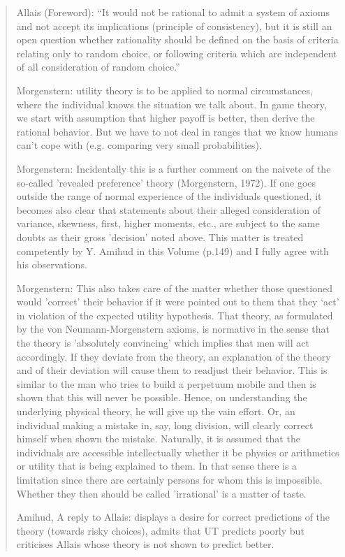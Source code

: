 \documentclass[preprint, french, english, 11pt, authoryear]{elsarticle}%
\begin{document}
\begin{quote}
Allais (Foreword): “It would not be rational to admit a system of axioms and not accept its implications (principle of consistency), but it is still an open question whether rationality should be defined on the basis of criteria relating only to random choice, or following criteria which are independent of all consideration of random choice.” 

Morgenstern: utility theory is to be applied to normal circumstances, where the individual knows the situation we talk about. In game theory, we start with assumption that higher payoff is better, then derive the rational behavior. But we have to not deal in ranges that we know humans can’t cope with (e.g. comparing very small probabilities).

Morgenstern: Incidentally this is a further comment on the naivete of the so-called 'revealed preference' theory (Morgenstern, 1972). If one goes outside the range of normal experience of the individuals questioned, it becomes also clear that statements about their alleged consideration of variance, skewness, first, higher moments, etc., are subject to the same doubts as their gross 'decision' noted above. This matter is treated competently by Y. Amihud in this Volume (p.149) and I fully agree with his observations.

Morgenstern: This also takes care of the matter whether those questioned would 'correct' their behavior if it were pointed out to them that they ‘act’ in violation of the expected utility hypothesis. That theory, as formulated by the von Neumann-Morgenstern axioms, is normative in the sense that the theory is 'absolutely convincing' which implies that men will act accordingly. If they deviate from the theory, an explanation of the theory and of their deviation will cause them to readjust their behavior. This is similar to the man who tries to build a perpetuum mobile and then is shown that this will never be possible. Hence, on understanding the underlying physical theory, he will give up the vain effort. Or, an individual making a mistake in, say, long division, will clearly correct himself when shown the mistake. Naturally, it is assumed that the individuals are accessible intellectually whether it be physics or arithmetics or utility that is being explained to them. In that sense there is a limitation since there are certainly persons for whom this is impossible. Whether they then should be called 'irrational' is a matter of taste.

Amihud, A reply to Allais: displays a desire for correct predictions of the theory (towards risky choices), admits that UT predicts poorly but criticises Allais whose theory is not shown to predict better.
\end{quote}
\end{document}
